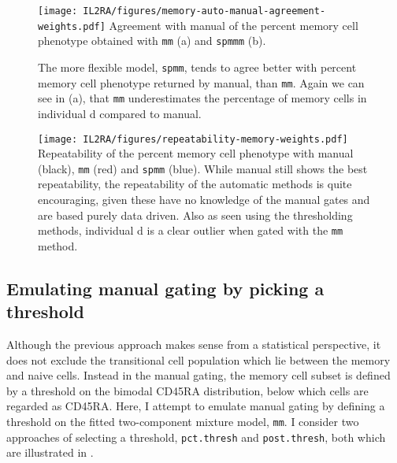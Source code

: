 \begin{figure}[h]
\centering
\texttt{[image: IL2RA/figures/memory-auto-manual-agreement-weights.pdf]}
{Agreement with manual of the percent memory cell phenotype obtained with \texttt{mm} (a) and \texttt{spmmm} (b).}
{
  The more flexible model, \texttt{spmm}, tends to agree better with percent memory cell phenotype returned by manual, than \texttt{mm}.
  Again we can see in (a), that \texttt{mm} underestimates the percentage of memory cells in individual d compared to
  manual.

}
\end{figure}


\begin{figure}[h]
\centering
  \texttt{[image: IL2RA/figures/repeatability-memory-weights.pdf]}
{Repeatability of the percent memory cell phenotype with manual (black), \texttt{mm} (red) and \texttt{spmm} (blue).}
{
  While manual still shows the best repeatability, the repeatability of the automatic methods is quite encouraging, given
  these have no knowledge of the manual gates and are based purely data driven.
  Also as seen using the thresholding methods, individual d is a clear outlier when gated with the \texttt{mm} method.
}
\end{figure}


\subsection{Emulating manual gating by picking a threshold}

Although the previous approach makes sense from a statistical perspective, it does not exclude the transitional cell population which lie
between the memory and naive cells.
Instead in the manual gating, the memory cell subset is defined by a threshold on the bimodal CD45RA distribution, below which cells are regarded as CD45RA\negative.
Here, I attempt to emulate manual gating by defining a threshold on the fitted two-component mixture model, \texttt{mm}.
I consider two approaches of selecting a threshold, \texttt{pct.thresh} and \texttt{post.thresh}, both which are illustrated in .


